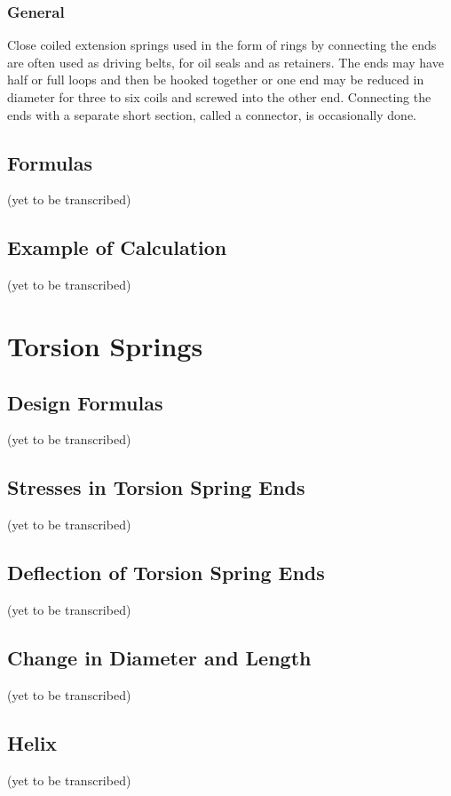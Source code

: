 \documentclass[10pt]{article}
\begin{document}
\subsubsection{General} %
Close coiled extension springs used in the form of rings by connecting the ends are often used as driving belts, for oil seals and as retainers.
The ends may have half or full loops and then be hooked together or one end may be reduced in diameter for three to six coils and screwed into the other end. 
Connecting the ends with a separate short section, called a connector, is occasionally done.

\subsection{Formulas}
(yet to be transcribed)

\subsection{Example of Calculation}
(yet to be transcribed)

\section{Torsion Springs} %
\subsection{Design Formulas} %
(yet to be transcribed)

\subsection{Stresses in Torsion Spring Ends} %
(yet to be transcribed)

\subsection{Deflection of Torsion Spring Ends} %
(yet to be transcribed)

\subsection{Change in Diameter and Length} %
(yet to be transcribed)

\subsection{Helix} %
(yet to be transcribed)
\end{document}
